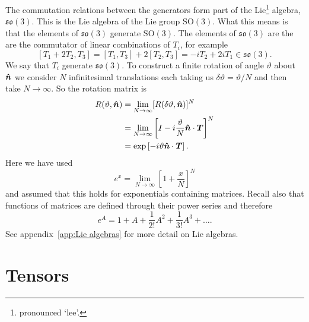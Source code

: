 \documentclass[a4paper]{article}
\renewcommand{\ident}{I}
\newcommand{\specialOrthogonalGroup}{\mathrm{SO}}
\newcommand{\lieAlgebra}[1]{\mathfrak{#1}}
\begin{document}
    The commutation relations between the generators form part of the Lie\footnote{pronounced `lee'.} algebra, \(\lieAlgebra{so}(3)\).
    This is the Lie algebra of the Lie group \(\specialOrthogonalGroup(3)\).
    What this means is that the elements of \(\lieAlgebra{so}(3)\) generate \(\specialOrthogonalGroup(3)\).
    The elements of \(\lieAlgebra{so}(3)\) are the are the commutator of linear combinations of \(T_i\), for example 
    \[[T_1 + 2T_2, T_3] = [T_1, T_3] + 2[T_2, T_3] = -iT_2 + 2iT_1 \in \lieAlgebra{so}(3).\]
    We say that \(T_i\) generate \(\lieAlgebra{so}(3)\).
    To construct a finite rotation of angle \(\vartheta\) about \(\bm{\hat{n}}\) we consider \(N\) infinitesimal translations each taking us \(\delta\vartheta = \vartheta/N\) and then take \(N\to\infty\).
    So the rotation matrix is
    \begin{align*}
        R(\vartheta, \vh{n}) &= \lim_{N\to\infty} [R(\delta\vartheta, \vh{n})]^N\\
        &= \lim_{N\to\infty} \left[\ident - i \frac{\vartheta}N{}\vh{n}\cdot\vv{T}\right]^N\\
        &= \exp\left[-i\vartheta\vh{n}\cdot\vv{T}\right].
    \end{align*}
    Here we have used
    \[e^x = \lim_{N\to\infty}\left[1 + \frac{x}{N}\right]^N\]
    and assumed that this holds for exponentials containing matrices.
    Recall also that functions of matrices are defined through their power series and therefore
    \[e^A = 1 + A + \frac{1}{2!}A^2 + \frac{1}{3!}A^3 + \dotsc.\]
    See appendix~\ref{app:Lie algebras} for more detail on Lie algebras.
    
    
    \section{Tensors}
\end{document}
